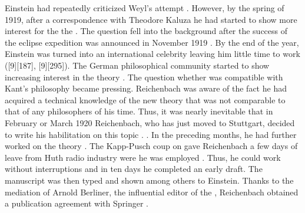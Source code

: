 \documentclass[draft]{article}
\begin{document}

Einstein had repeatedly criticized Weyl's attempt \citep{Einstein1918b}. However, by the spring of 1919, after a correspondence with Theodore Kaluza he had started to show more interest for the the \uftp \citep{Wuensch2005}. The question fell into the background after the success of the eclipse expedition was announced in November 1919 \citep{Dyson1920}. By the end of the year, Einstein was turned into an international celebrity leaving him little time to work ([9][187], [9][295]). The German philosophical community started to show increasing interest in the theory \citep{Hentschel1990}. The question whether was compatible with Kant's philosophy became pressing. Reichenbach was aware of the fact he had acquired a technical knowledge of the new theory that was not comparable to that of any philosophers of his time. Thus, it was nearly inevitable that in February or March 1920 Reichenbach, who has just moved to Stuttgart, decided to write his habilitation on this topic . . In the preceding months, he had further worked on the theory  \citep[044-06-23]{HR}. The Kapp-Pusch coup on  gave Reichenbach a few days of leave from Huth radio industry were he was employed \citep[044-06-23]{HR}. Thus, he could work without interruptions and in ten days he completed an early draft. The manuscript was then typed and shown among others to Einstein. Thanks to the mediation of Arnold Berliner, the influential editor of the , Reichenbach obtained a publication agreement with Springer \citep[044-06-23]{HR}.
\end{document}
